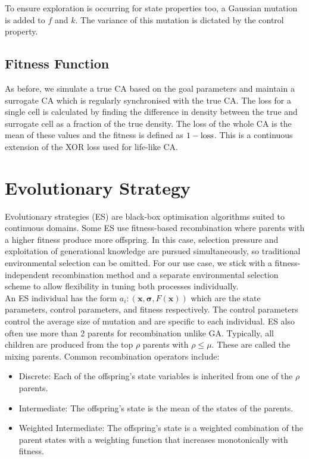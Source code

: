 To ensure exploration is occurring for state properties too, a Gaussian mutation is added to $f$ and $k$. The variance of this mutation is dictated by the control property.

\subsection{Fitness Function}
As before, we simulate a true CA based on the goal parameters and maintain a surrogate CA which is regularly synchronised with the true CA. The loss for a single cell is calculated by finding the difference in density between the true and surrogate cell as a fraction of the true density. The loss of the whole CA is the mean of these values and the fitness is defined as $1 - \textnormal{loss}$. This is a continuous extension of the XOR loss used for life-like CA.\\

\section{Evolutionary Strategy} \label{sec:es}
Evolutionary strategies (ES) are black-box optimisation algorithms suited to continuous domains. Some ES use fitness-based recombination where parents with a higher fitness produce more offspring\cite{hansen2015evolution}. In this case, selection pressure and exploitation of generational knowledge are pursued simultaneously, so traditional environmental selection can be omitted. For our use case, we stick with a fitness-independent recombination method and a separate environmental selection scheme to allow flexibility in tuning both processes individually.\\

An ES individual has the form $a_i: (\bm{x}, \bm{\sigma}, F(\bm{x}))$ which are the state parameters, control parameters, and fitness respectively. The control parameters control the average size of mutation and are specific to each individual. ES also often use more than 2 parents for recombination unlike GA. Typically, all children are produced from the top $\rho$ parents with $\rho \leq \mu$. These are called the mixing parents. Common recombination operators include:
\begin{itemize}
  \item Discrete: Each of the offspring's state variables is inherited from one of the $\rho$ parents.
  \item Intermediate: The offspring's state is the mean of the states of the parents.
  \item Weighted Intermediate: The offspring's state is a weighted combination of the parent states with a weighting function that increases monotonically with fitness.
\end{itemize}

